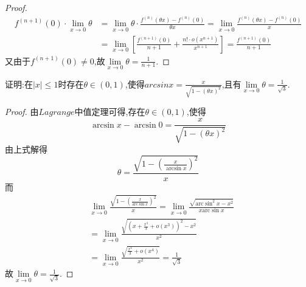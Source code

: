 \documentclass[lang=cn,newtx,10pt,scheme=chinese]{../Template/elegantbook}
\begin{document}
\begin{proof}
        \begin{equation}
        \begin{split}
            f^{\left( n+1 \right)}\left( 0 \right) \cdot \underset{x\rightarrow 0}{\lim}\theta &=\underset{x\rightarrow 0}{\lim}\theta \cdot \frac{f^{\left( n \right)}\left( \theta x \right) -f^{\left( n \right)}\left( 0 \right)}{\theta x}=\underset{x\rightarrow 0}{\lim}\frac{f^{\left( n \right)}\left( \theta x \right) -f^{\left( n \right)}\left( 0 \right)}{x}
            \\
            &=\underset{x\rightarrow 0}{\lim}\left[ \frac{f^{\left( n+1 \right)}\left( 0 \right)}{n+1}+\frac{n!\cdot o\left( x^{n+1} \right)}{x^{n+1}} \right] =\frac{f^{\left( n+1 \right)}\left( 0 \right)}{n+1}
        \end{split}
        \nonumber  
    \end{equation}
        又由于\(f^{(n + 1)}(0)\neq0\),故$\underset{x\rightarrow 0}{\lim}\theta =\frac{1}{n+1}$.
    
\end{proof}


\begin{exercise}
    证明:在\(\vert x\vert\leqslant 1\)时存在\(\theta\in(0,1)\),使得\(arcsinx=\frac{x}{\sqrt{1-\left( \theta x \right) ^2}}\),且有\(\lim\limits_{x\to0}\theta=\frac{1}{\sqrt{3}}\).
\end{exercise}
    \begin{proof}
        由$Lagrange$中值定理可得,存在$\theta\in(0,1)$,使得
        \begin{equation}
            \arcsin x-\arcsin 0=\frac{x}{\sqrt{1-\left( \theta x \right) ^2}}
        \nonumber
        \end{equation}
        由上式解得
        \begin{equation}
            \theta =\frac{\sqrt{1-\left( \frac{x}{\arcsin x} \right) ^2}}{x}
            \nonumber
        \end{equation}
        而
        \begin{equation}
            \begin{split}
                &\lim_{x\rightarrow 0} \frac{\sqrt{1-\left( \frac{x}{\mathrm{arc}\sin x} \right) ^2}}{x}=\lim_{x\rightarrow 0} \frac{\sqrt{\mathrm{arc}\sin ^2x-x^2}}{x\mathrm{arc}\sin x}
                \\
                &=\lim_{x\rightarrow 0} \frac{\sqrt{\left( x+\frac{x^3}{3}+o\left( x^3 \right) \right) ^2-x^2}}{x^2}
                \\
                &=\lim_{x\rightarrow 0} \frac{\sqrt{\frac{x^4}{3}+o\left( x^4 \right)}}{x^2}=\frac{1}{\sqrt{3}}
            \end{split}
            \nonumber
        \end{equation}
        故\(\lim\limits_{x\to0}\theta=\frac{1}{\sqrt{3}}\).
    
\end{proof}
\end{document}
